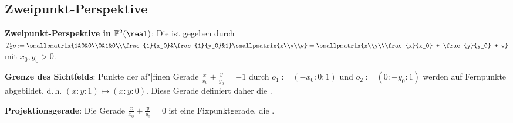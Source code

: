 \subsection{%
    Zweipunkt-Perspektive%
}

\textbf{Zweipunkt-Perspektive in $\PP^2(\real)$}:
Die  ist gegeben durch
$T_2 p := \smallpmatrix{1&0&0\\0&1&0\\\frac{1}{x_0}&\frac{1}{y_0}&1} \smallpmatrix{x\\y\\w}
= \smallpmatrix{x\\y\\\frac{x}{x_0} + \frac{y}{y_0} + w}$ mit $x_0, y_0 > 0$.

\vspace{2mm}
\linie

\textbf{Grenze des Sichtfelds}:
Punkte der af"|finen Gerade $\frac{x}{x_0} + \frac{y}{y_0} = -1$ durch $o_1 := (-x_0:0:1)$ und
$o_2 := (0:-y_0:1)$ werden auf Fernpunkte abgebildet, d.\,h. $(x:y:1) \mapsto (x:y:0)$.
Diese Gerade definiert daher die .

\textbf{Projektionsgerade}:
Die Gerade $\frac{x}{x_0} + \frac{y}{y_0} = 0$ ist eine Fixpunktgerade, die
.


